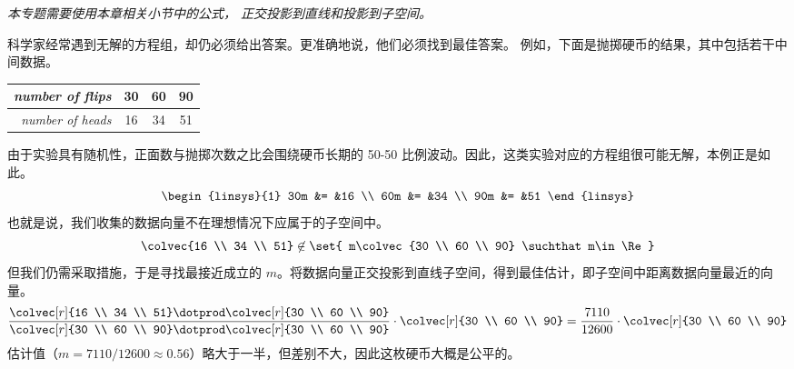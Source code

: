 \textit{本专题需要使用本章相关小节中的公式，
        正交投影到直线和投影到子空间。} 

科学家经常遇到无解的方程组，却仍必须给出答案。更准确地说，他们必须找到最佳答案。
例如，下面是抛掷硬币的结果，其中包括若干中间数据。
\begin{center} \small
  \begin{tabular}{r|ccc}
     \textit{number of flips}  &30  &60  &90   \\
     \hline
     \textit{number of heads}  &16  &34  &51
  \end{tabular}
\end{center}
由于实验具有随机性，正面数与抛掷次数之比会围绕硬币长期的 50-50 比例波动。因此，这类实验对应的方程组很可能无解，本例正是如此。 
\begin{equation*}
  \begin{linsys}{1}
    30m  &=  &16    \\
    60m  &=  &34    \\
    90m  &=  &51
  \end{linsys}
\end{equation*}
也就是说，我们收集的数据向量不在理想情况下应属于的子空间中。
\begin{equation*}
  \colvec{16 \\ 34 \\ 51}\not\in
    \set{ m\colvec{30 \\ 60 \\ 90}  \suchthat m\in\Re}
\end{equation*}
但我们仍需采取措施，于是寻找最接近成立的 $m$。将数据向量正交投影到直线子空间，得到最佳估计，即子空间中距离数据向量最近的向量。
\begin{equation*}
  \frac{ \colvec[r]{16 \\ 34 \\ 51}\dotprod\colvec[r]{30 \\ 60 \\ 90} }{
           \colvec[r]{30 \\ 60 \\ 90}\dotprod\colvec[r]{30 \\ 60 \\ 90} }
     \cdot\colvec[r]{30 \\ 60 \\ 90}
  =\frac{7110}{12600}\cdot \colvec[r]{30 \\ 60 \\ 90}
\end{equation*}
估计值（\( m=7110/12600\approx 0.56 \)）略大于一半，但差别不大，因此这枚硬币大概是公平的。 

